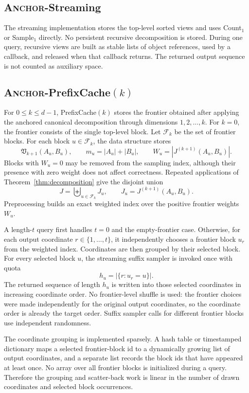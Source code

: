 \documentclass[11pt]{article}
\DeclareRobustCommand{\ANCHOR}{\textnormal{\textsc{Anchor}}}
\theoremstyle{definition}
\begin{document}
\subsection{\texorpdfstring{\ANCHOR-Streaming}{ANCHOR-Streaming}}

The streaming implementation stores the top-level sorted views and uses Count$_1$ or Sample$_1$ directly.  No persistent recursive decomposition is stored.  During one query, recursive views are built as stable lists of object references, used by a callback, and released when that callback returns.  The returned output sequence is not counted as auxiliary space.

\subsection{\texorpdfstring{\ANCHOR-PrefixCache$(k)$}{ANCHOR-PrefixCache(k)}}

For $0\le k\le d-1$, PrefixCache$(k)$ stores the frontier obtained after applying the anchored canonical decomposition through dimensions $1,2,\ldots,k$.  For $k=0$, the frontier consists of the single top-level block.  Let $\mathcal F_k$ be the set of frontier blocks.  For each block $u\in\mathcal F_k$, the data structure stores
\[
  \mathfrak V_{k+1}(A_u,B_u),
  \qquad
  m_u=|A_u|+|B_u|,
  \qquad
  W_u=|J^{(k+1)}(A_u,B_u)|.
\]
Blocks with $W_u=0$ may be removed from the sampling index, although their presence with zero weight does not affect correctness.  Repeated applications of Theorem~\ref{thm:decomposition} give the disjoint union
\[
  J=\biguplus_{u\in\mathcal F_k}J_u,
  \qquad
  J_u=J^{(k+1)}(A_u,B_u).
\]
Preprocessing builds an exact weighted index over the positive frontier weights $W_u$.

A length-$t$ query first handles $t=0$ and the empty-frontier case.  Otherwise, for each output coordinate $r\in\{1,\ldots,t\}$, it independently chooses a frontier block $u_r$ from the weighted index.  Coordinates are then grouped by their selected block.  For every selected block $u$, the streaming suffix sampler is invoked once with quota
\[
  h_u=|\{r:u_r=u\}|.
\]
The returned sequence of length $h_u$ is written into those selected coordinates in increasing coordinate order.  No frontier-level shuffle is used: the frontier choices were made independently for the original output coordinates, so the coordinate order is already the target order.  Suffix sampler calls for different frontier blocks use independent randomness.

The coordinate grouping is implemented sparsely.  A hash table or timestamped dictionary maps a selected frontier-block id to a dynamically growing list of output coordinates, and a separate list records the block ids that have appeared at least once.  No array over all frontier blocks is initialized during a query.  Therefore the grouping and scatter-back work is linear in the number of drawn coordinates and selected block occurrences.
\end{document}

